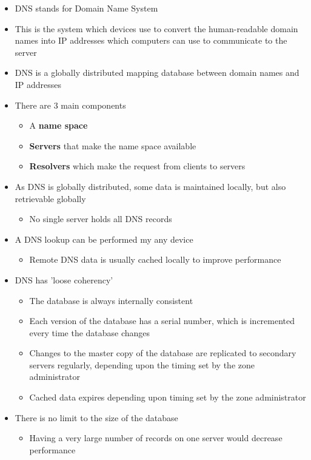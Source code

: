 \begin{itemize}
  \item DNS stands for Domain Name System
  \item This is the system which devices use to convert the human-readable domain names into IP addresses which computers can use to communicate to the server
  \item DNS is a globally distributed mapping database between domain names and IP addresses
  \item There are 3 main components
  \begin{itemize}
    \item A \textbf{name space}
    \item \textbf{Servers} that make the name space available
    \item \textbf{Resolvers} which make the request from clients to servers
  \end{itemize}
  \item As DNS is globally distributed, some data is maintained locally, but also retrievable globally
  \begin{itemize}
    \item No single server holds all DNS records
  \end{itemize}
  \item A DNS lookup can be performed my any device
  \begin{itemize}
    \item Remote DNS data is usually cached locally to improve performance
  \end{itemize}
  \item DNS has 'loose coherency'
  \begin{itemize}
    \item The database is always internally consistent
    \item Each version of the database has a serial number, which is incremented every time the database changes
    \item Changes to the master copy of the database are replicated to secondary servers regularly, depending upon the timing set by the zone administrator
    \item Cached data expires depending upon timing set by the zone administrator
  \end{itemize}
  \item There is no limit to the size of the database
  \begin{itemize}
    \item Having a very large number of records on one server would decrease performance

\end{itemize}
\end{itemize}
